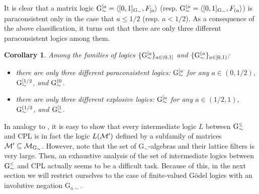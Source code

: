 \documentclass{article}
\newtheorem{corollary}{Corollary}
\theoremstyle{definition}
\newcommand{\Gsimleq}{\mathrm{G}\mystrut^{\text{\tiny $\leq$}}_{\sim}}
\newcommand\mystrut{\rule{0pt}{7pt}}
\begin{document}
It is clear that a matrix  logic ${\rm G}^{[a}_\sim = \langle [0,1]_{\rm{G}_\sim}, F_{[a}\rangle$ (resp. ${\rm G}^{(a}_\sim=\langle [0,1]_{\rm{G}_\sim}, F_{(a} \rangle$) is paraconsistent only in the case that $a \leq 1/2$ (resp. $a < 1/2$). As a consequence of the above classification, it turns out that there are only three different paraconsistent logics among them.

\begin{corollary} Among the families of logics 
$\{{\rm G}^{[a}_\sim \}_{a \in (0, 1]}$ and $\{{\rm G}^{(a}_\sim\}_{a \in [0, 1)}$: 
\begin{itemize}
\item there are only three different paraconsistent logics:  ${\rm G}^{[a}_\sim$ for any $a \in (0, 1/2)$,  ${\rm G}^{[1/2}_\sim$, and ${\rm G}^{(0}_\sim$.
\item there are only three different explosive logics: ${\rm G}^{[a}_\sim$ for any $a \in (1/2, 1)$,  ${\rm G}^{(1/2}_\sim$, and ${\rm G}^{[1}_\sim$.
\end{itemize}
\end{corollary}

In analogy to \cite[Theorem 2]{CoEsGo}, it is easy to show that every intermediate logic $L$ between $\Gsimleq$ and CPL  is in fact the logic $L({\cal M}')$ defined by a subfamily of matrices ${\cal M}' \subseteq {\cal M}_{{\rm G}_\sim}$.
However, note that the set of G$_{\sim}$-algebras and their lattice filters is very large. Then, an exhaustive analysis of the set of intermediate logics between $\Gsimleq$ and CPL actually seems to be a difficult task. Because of this, in the next section we will restrict ourselves to the case of finite-valued G\"odel logics with an involutive negation G$_{n \sim}$.
\end{document}
